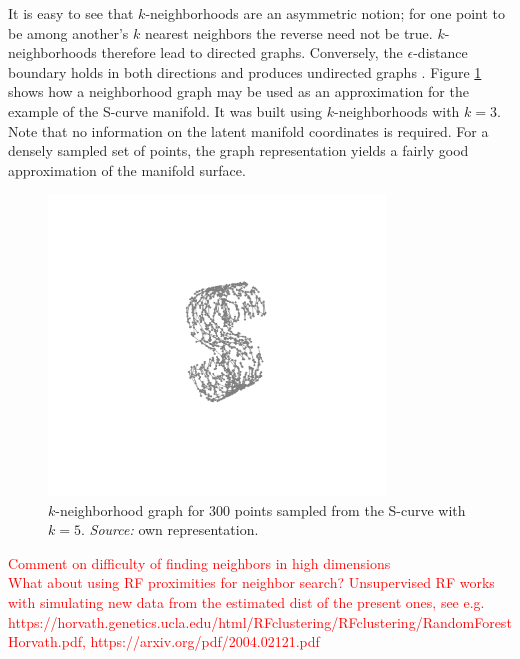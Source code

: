 \begin{minipage}[b]{0.5\textwidth}
  It is easy to see that $k$-neighborhoods are an asymmetric notion; for one 
  point to be among another's $k$ nearest neighbors the reverse need not be 
  true.
  $k$-neighborhoods therefore lead to directed graphs.
  Conversely, the $\epsilon$-distance boundary holds in both directions and 
  produces undirected graphs \citep{heetal2005}.
  Figure \ref{fig:neighbor-graph} shows how a neighborhood graph may be used as 
  an approximation for the example of the S-curve manifold.
  It was built using $k$-neighborhoods with $k = 3$.
  Note that no information on the latent manifold coordinates is required.
  For a densely sampled set of points, the graph representation yields a fairly
  good approximation of the manifold surface.
\end{minipage}
\begin{minipage}[b]{0.05\textwidth}
  \phantom{xxx}
\end{minipage}
\begin{minipage}[b]{0.45\textwidth}
  \begin{figure}[H]
    \centering
    \includegraphics[trim = 250 170 200 140, clip, %
      width = 0.8\textwidth]{figures/s-curve-connected}
    \caption[S-curve neighborhood graph]{$k$-neighborhood graph for 300 points 
    sampled from the S-curve with $k = 5$.
    \textit{Source:} own representation.}
    \label{fig:neighbor-graph}
  \end{figure}
\end{minipage}

\textcolor{red}{Comment on difficulty of finding neighbors in high dimensions}
\\
\textcolor{red}{What about using RF proximities for neighbor search? 
Unsupervised RF works with simulating new data from the estimated dist of the 
present ones, see e.g. https://horvath.genetics.ucla.edu/html/RFclustering/RFclustering/RandomForestHorvath.pdf, https://arxiv.org/pdf/2004.02121.pdf}

